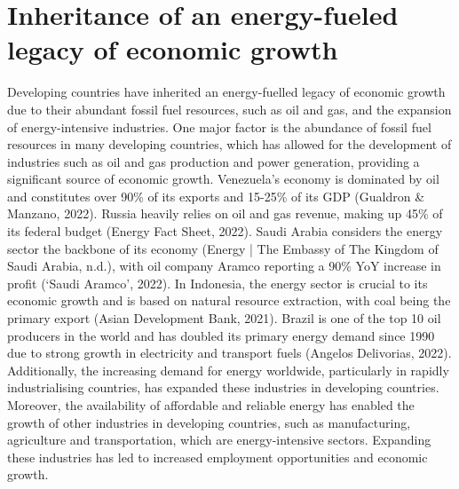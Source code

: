 \documentclass[12pt,a4paper]{article}
\begin{document}
\section*{Inheritance of an energy-fueled legacy of economic growth}
Developing countries have inherited an energy-fuelled legacy of economic growth due to their abundant fossil fuel resources, such as oil and gas, and the expansion of energy-intensive industries. One major factor is the abundance of fossil fuel resources in many developing countries, which has allowed for the development of industries such as oil and gas production and power generation, providing a significant source of economic growth. Venezuela's economy is dominated by oil and constitutes over 90\% of its exports and 15-25\% of its GDP (Gualdron \& Manzano, 2022). Russia heavily relies on oil and gas revenue, making up 45\% of its federal budget (Energy Fact Sheet, 2022). Saudi Arabia considers the energy sector the backbone of its economy (Energy | The Embassy of The Kingdom of Saudi Arabia, n.d.), with oil company Aramco reporting a 90\% YoY increase in profit (`Saudi Aramco', 2022). In Indonesia, the energy sector is crucial to its economic growth and is based on natural resource extraction, with coal being the primary export (Asian Development Bank, 2021). Brazil is one of the top 10 oil producers in the world and has doubled its primary energy demand since 1990 due to strong growth in electricity and transport fuels (Angelos Delivorias, 2022).
Additionally, the increasing demand for energy worldwide, particularly in rapidly industrialising countries, has expanded these industries in developing countries. Moreover, the availability of affordable and reliable energy has enabled the growth of other industries in developing countries, such as manufacturing, agriculture and transportation, which are energy-intensive sectors. Expanding these industries has led to increased employment opportunities and economic growth. 

\newpage
\end{document}
